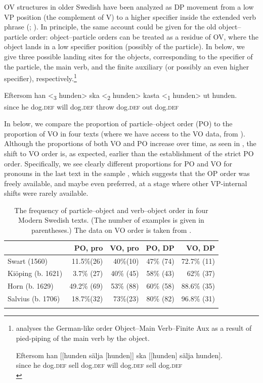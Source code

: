 \documentclass[output=paper]{langscibook}
\begin{document}
OV structures in older Swedish have been analyzed as DP movement from a low VP position (the complement of V) to a higher specifier inside the extended verb phrase (\citealt{Delsing1999}; \citealt{Petzell2011, Petzell2012, Petzell2011}). In principle, the same account could be given for the old object–particle order: object–particle orders can be treated as a residue of OV, where the object lands in a low specifier position (possibly of the particle). In  below, we give three possible landing sites for the objects, corresponding to the specifier of the particle, the main verb, and the finite auxiliary (or possibly an even higher specifier), respectively.\footnote{\citet{Petzell2012} analyses the German-like order Object–Main Verb–Finite Aux as a result of pied-piping of the main verb by the object.

    \ea
    \gll  Eftersom    han [[hunden   sälja [hunden]]   ska [[hunden]   sälja   hunden].\\
    since   he     dog.\textsc{def}   sell       dog.\textsc{def}     will   dog.\textsc{def}     sell   dog.\textsc{def}\\
    \z}


\ea\label{ex:lalu:46}
\gll Eftersom  han <\textsubscript{3} hunden>   ska   <\textsubscript{2} hunden> kasta     <\textsubscript{1} hunden>   ut     hunden.\\
since        he      dog\textsc{.def}  will     dog\textsc{.def}  throw        dog\textsc{.def}   out   dog\textsc{.def}  \\
\z


In  below, we compare the proportion of particle–object order (PO) to the proportion of VO in four texts (where we have access to the VO data, from \citealt{Petzell2012}). Although the proportions of both VO and PO increase over time, as seen in , the shift to VO order is, as expected, earlier than the establishment of the strict PO order. Specifically, we see clearly different proportions for PO and VO for pronouns in the last text in the sample \citep{Salvius1706}, which suggests that the OP order was freely available, and maybe even preferred, at a stage where other VP-internal shifts were rarely available.


\begin{table}
\caption{The frequency of particle–object and verb–object order in four Modern Swedish texts. (The number of examples is given in parentheses.) The data on VO order is taken from \citet{Petzell2012}.}
\label{tab:lalu:3}
\begin{tabularx}{0.85\textwidth}{Xrrrr}
\lsptoprule
& PO, pro & VO, pro & PO, DP & VO, DP\\
\midrule
Swart (1560) & 11.5\%(26) & 40\%(10) & 47\% (74) & 72.7\% (11)\\
Kiöping (b. 1621) & 3.7\% (27) & 40\% (45) & 58\% (43) & 62\%   (37)\\
Horn (b. 1629) & 49.2\%   (69) & 53\%   (88) & 60\% (58) & 88.6\% (35)\\
Salvius (b. 1706) & 18.7\%(32) & 73\%(23) & 80\% (82) & 96.8\% (31)\\
\lspbottomrule
\end{tabularx}
\end{table}
\end{document}
